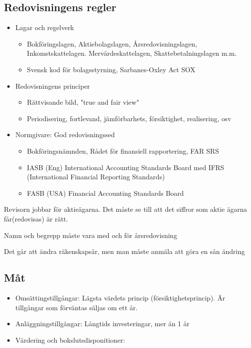 \documentclass{article}
\begin{document}
\subsection{Redovisningens regler}
\begin{itemize}
    \item Lagar och regelverk
    \begin{itemize}
        \item Bokföringslagen, Aktiebolagslagen, Årsredovisningslagen, Inkomstskattelagen.
        Mervärdeskattelagen, Skattebetalningslagen m.m.
        \item Svensk kod för bolagsstyrning, Sarbanes-Oxley Act SOX 
    \end{itemize}
    \item Redovisningens principer
    \begin{itemize}
        \item Rättvisande bild, "true and fair view"
        \item Periodisering, fortlevand, jämförbarhets, försiktighet, realisering, osv
    \end{itemize}
    \item Normgivare: God redovisningssed
    \begin{itemize}
        \item Bokföringsnämnden, Rådet för finansiell rapportering, FAR SRS 
        \item IASB (Eng) International Accounting Standards Board med IFRS (International Financial Reporting Standards)
        \item FASB (USA) Financial Accounting Standards Board
    \end{itemize}
\end{itemize}

Revisorn jobbar för aktieägarna. Det måste se till att det siffror som aktie ägarna får(redovisas) 
är rätt.

Namn och begrepp måste vara med och för årsredovisning

Det går att ändra räkenskapsår, men man måste anmäla att göra en sån ändring


\subsection{Måt}
\begin{itemize}
    \item Omsättingstillgångar: Lägsta värdets princip (försiktighetsprincip). Är tillgångar som förväntas säljas om ett år.
    \item Anläggningstillgångar: Långtids investeringar, mer än 1 år
    \item Värdering och bokslutsdisponitioner: %
\end{itemize}
\end{document}
